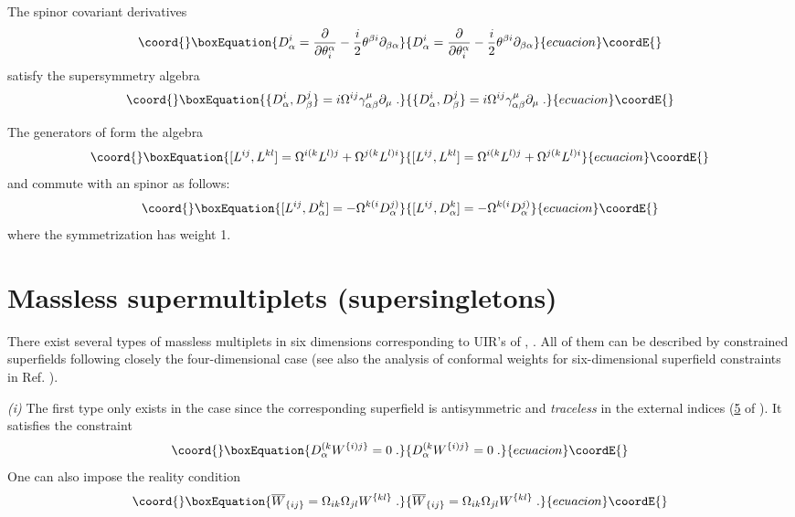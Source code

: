 \documentclass[a4paper,12pt]{article}
\begin{document}
The spinor covariant derivatives 
\begin{equation}\coord{}\boxEquation{\label{5}
  D^i_\alpha = {\partial\over \partial \theta^\alpha_i} -{i\over 
2}\theta^{\beta i} \partial_{\beta\alpha} 
}{D^i_\alpha = {\partial\over \partial \theta^\alpha_i} -{i\over 
2}\theta^{\beta i} \partial_{\beta\alpha} 
}{ecuacion}\coordE{}\end{equation}
satisfy the supersymmetry algebra
\begin{equation}\coord{}\boxEquation{\label{6}
  \{ D^i_\alpha, D^j_\beta\} = 
i\Omega^{ij}\gamma^\mu_{\alpha\beta}\partial_\mu\;.
}{\{ D^i_\alpha, D^j_\beta\} = 
i\Omega^{ij}\gamma^\mu_{\alpha\beta}\partial_\mu\;.
}{ecuacion}\coordE{}\end{equation}

 
The generators of \coordHE{}  \coordHE{} form the 
algebra 
\begin{equation}\coord{}\boxEquation{\label{7}
  [L^{ij},L^{kl}]= \Omega^{i(k}L^{l)j} + \Omega^{j(k}L^{l)i}
}{[L^{ij},L^{kl}]= \Omega^{i(k}L^{l)j} + \Omega^{j(k}L^{l)i}
}{ecuacion}\coordE{}\end{equation}
and commute with an \coordHE{} spinor as follows:
\begin{equation}\coord{}\boxEquation{\label{7'}
  [L^{ij},D^k_\alpha]= -\Omega^{k(i}D^{j)}_\alpha
}{[L^{ij},D^k_\alpha]= -\Omega^{k(i}D^{j)}_\alpha
}{ecuacion}\coordE{}\end{equation}
where the symmetrization has weight 1. 


\section{Massless supermultiplets (supersingletons)}


There exist several types of massless multiplets in six dimensions 
corresponding to UIR's of \coordHE{}, \coordHE{}. All of them can 
be described by constrained superfields following closely the 
four-dimensional case \cite{SHST} (see also the analysis of conformal weights for
six-dimensional superfield constraints in Ref. \cite{Park}). 


{\sl (i)} The first type only exists in the case \coordHE{} since 
the corresponding superfield \coordHE{} is 
antisymmetric and {\sl traceless} in the external indices 
({\underline 5 } of \coordHE{}). It satisfies the 
constraint \cite{HSiT} 
\begin{equation}\coord{}\boxEquation{\label{8}
  D^{(k}_\alpha W^{\{i)j\}}=0\;.
}{D^{(k}_\alpha W^{\{i)j\}}=0\;.
}{ecuacion}\coordE{}\end{equation}
One can also impose the reality condition
\begin{equation}\coord{}\boxEquation{\label{8'}
  \overline W_{\{ij\}} = \Omega_{ik}\Omega_{jl} W^{\{kl\}}\;.
}{\overline W_{\{ij\}} = \Omega_{ik}\Omega_{jl} W^{\{kl\}}\;.
}{ecuacion}\coordE{}\end{equation}
\end{document}
